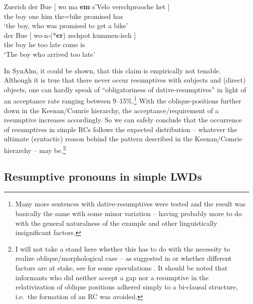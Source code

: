\documentclass[output=paper]{langsci/langscibook}
\begin{document}
\ea\label{ex:key:36.13}Zuerich 
    \ea
    \gll    der Bue [ wo ma \textbf{em} s’Velo verschprooche het ] \\
    the boy {} \Rci{} one him the=bike promised has \\
    \glt    \enquote*{the boy, who was promised to get a bike}\\
    \ex
    \gll    der Bue [ wo-n\footnotemark-(*\textbf{er}) zschpot kummen-isch ] \\
            the boy {}  {\Rci{}\hphantom{-n-(*}he}    too late come        is\\
    \glt    ‘The boy who arrived too late’
    \z
\z
{}

In SynAlm, it could be shown, that this claim is empirically not tenable.
Although it is true that there never occur resumptives with subjects and
(direct) objects, one can hardly speak of \enquote{obligatoriness of
dative-resumptives} in light of an acceptance rate ranging between
9--15\%.\footnote{Many more sentences with dative-resumptives were tested and
    the result was basically the same with some minor variation – having
    probably more to do with the general naturalness of the example and other
linguistically insignificant factors.} With the oblique-positions further down
in the Keenan/Comrie hierarchy, the acceptance/requirement of a resumptive
increases accordingly. So we can safely conclude that the occurrence of
resumptives in simple \glspl{RC} follows the expected distribution – whatever the
ultimate (syntactic) reason behind the pattern described in the Keenan/Comrie
hierarchy – may be.\footnote{I will not take a stand here whether this has to
    do with the necessity to realize oblique/morphological
    case – as suggested
    in \citet{Salzmann2006} or whether different factors are at stake, see for
    some speculations \textcite{BrandnerBucheli2018}. It should be noted that
    informants who did neither accept a gap nor a resumptive in the
    relativization of oblique positions adhered simply to a bi-clausal
    structure, i.e.\ the formation of an \gls{RC} was avoided.}

\subsection{Resumptive pronouns in simple LWDs}\label{sub:36.3.2} %
\end{document}
